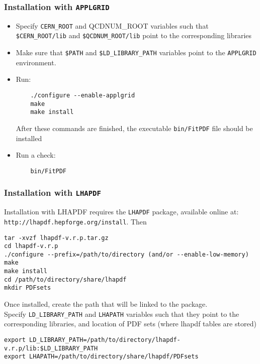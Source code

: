 \subsubsection{Installation with {\tt APPLGRID}}
\begin{itemize}
\item
 Specify {\tt CERN\_ROOT} and {QCDNUM\_ROOT} variables such that\\
     \verb'$CERN_ROOT/lib' and \verb'$QCDNUM_ROOT/lib'
 point to the corresponding libraries
\item Make sure that {\tt \$PATH} and {\tt \$LD\_LIBRARY\_PATH} 
variables point to the {\tt APPLGRID} environment.
\item Run:
\begin{verbatim}
    ./configure --enable-applgrid
    make 
    make install
\end{verbatim}
After these commands are finished, the executable {\tt bin/FitPDF} 
file should be installed
\item  Run a check:
\begin{verbatim}
    bin/FitPDF 
\end{verbatim}
\end{itemize}
\subsubsection{Installation with {\tt LHAPDF}}\label{sec:install_lhapdf}

Installation with LHAPDF requires the {\tt LHAPDF} package, available online at:\\
{\tt http://lhapdf.hepforge.org/install}.
Then
\begin{verbatim}
tar -xvzf lhapdf-v.r.p.tar.gz
cd lhapdf-v.r.p
./configure --prefix=/path/to/directory (and/or --enable-low-memory)
make
make install
cd /path/to/directory/share/lhapdf
mkdir PDFsets
\end{verbatim}

Once installed, create the path that will be linked to the \fitter package.\\
 Specify \verb'LD_LIBRARY_PATH'
     and {\tt LHAPATH} variables such that they
 point to the corresponding libraries, and location of PDF sets (where lhapdf tables are stored)
\begin{verbatim}
export LD_LIBRARY_PATH=/path/to/directory/lhapdf-v.r.p/lib:$LD_LIBRARY_PATH
export LHAPATH=/path/to/directory/share/lhapdf/PDFsets
\end{verbatim}



